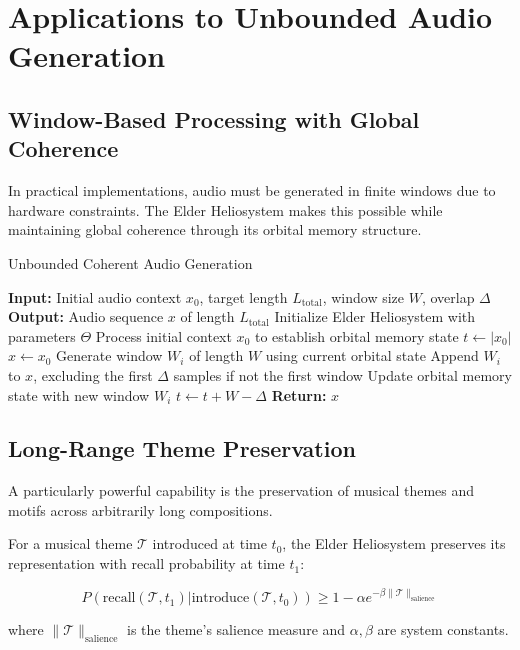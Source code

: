 \section{Applications to Unbounded Audio Generation}

\subsection{Window-Based Processing with Global Coherence}

In practical implementations, audio must be generated in finite windows due to hardware constraints. The Elder Heliosystem makes this possible while maintaining global coherence through its orbital memory structure.

\begin{algorithm}
\caption{Unbounded Coherent Audio Generation}
\begin{algorithmic}[1]
\State \textbf{Input:} Initial audio context $x_0$, target length $L_{\text{total}}$, window size $W$, overlap $\Delta$
\State \textbf{Output:} Audio sequence $x$ of length $L_{\text{total}}$
\State Initialize Elder Heliosystem with parameters $\Theta$
\State Process initial context $x_0$ to establish orbital memory state
\State $t \gets |x_0|$
\State $x \gets x_0$
    \State Generate window $W_i$ of length $W$ using current orbital state
    \State Append $W_i$ to $x$, excluding the first $\Delta$ samples if not the first window
    \State Update orbital memory state with new window $W_i$
    \State $t \gets t + W - \Delta$
\EndWhile
\State \textbf{Return:} $x$
\end{algorithmic}
\end{algorithm}

\subsection{Long-Range Theme Preservation}

A particularly powerful capability is the preservation of musical themes and motifs across arbitrarily long compositions.

\begin{theorem}
For a musical theme $\mathcal{T}$ introduced at time $t_0$, the Elder Heliosystem preserves its representation with recall probability at time $t_1$:

\begin{equation}
P(\text{recall}(\mathcal{T}, t_1) | \text{introduce}(\mathcal{T}, t_0)) \geq 1 - \alpha e^{-\beta \|\mathcal{T}\|_{\text{salience}}}
\end{equation}

where $\|\mathcal{T}\|_{\text{salience}}$ is the theme's salience measure and $\alpha, \beta$ are system constants.
\end{theorem}

